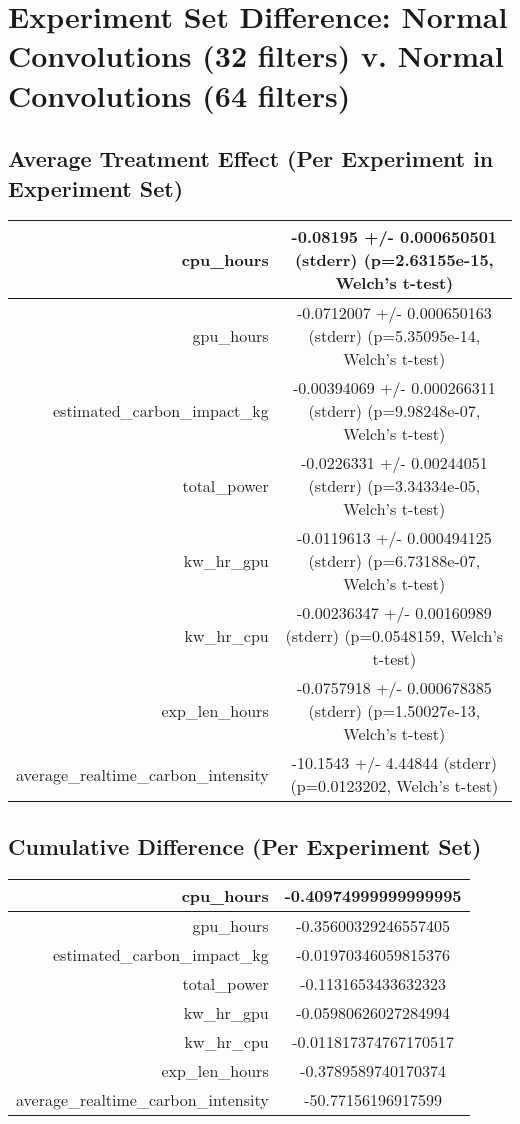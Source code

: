 \documentclass{article}%
\begin{document}
%
\normalsize%
\section{Experiment Set Difference: Normal Convolutions (32 filters) v. Normal Convolutions (64 filters)}%
\label{sec:Experiment Set Difference Normal Convolutions (32 filters) v. Normal Convolutions (64 filters)}%
\subsection{Average Treatment Effect (Per Experiment in Experiment Set)}%
\label{subsec:Average Treatment Effect (Per Experiment in Experiment Set)}%
\begin{tabular}{|r|c|}%
\hline%
cpu\_hours&{-}0.08195 +/{-} 0.000650501 (stderr) (p=2.63155e{-}15, Welch's t{-}test)\\%
\hline%
gpu\_hours&{-}0.0712007 +/{-} 0.000650163 (stderr) (p=5.35095e{-}14, Welch's t{-}test)\\%
\hline%
estimated\_carbon\_impact\_kg&{-}0.00394069 +/{-} 0.000266311 (stderr) (p=9.98248e{-}07, Welch's t{-}test)\\%
\hline%
total\_power&{-}0.0226331 +/{-} 0.00244051 (stderr) (p=3.34334e{-}05, Welch's t{-}test)\\%
\hline%
kw\_hr\_gpu&{-}0.0119613 +/{-} 0.000494125 (stderr) (p=6.73188e{-}07, Welch's t{-}test)\\%
\hline%
kw\_hr\_cpu&{-}0.00236347 +/{-} 0.00160989 (stderr) (p=0.0548159, Welch's t{-}test)\\%
\hline%
exp\_len\_hours&{-}0.0757918 +/{-} 0.000678385 (stderr) (p=1.50027e{-}13, Welch's t{-}test)\\%
\hline%
average\_realtime\_carbon\_intensity&{-}10.1543 +/{-} 4.44844 (stderr) (p=0.0123202, Welch's t{-}test)\\%
\hline%
\end{tabular}

%
\subsection{Cumulative Difference (Per Experiment Set)}%
\label{subsec:Cumulative Difference (Per Experiment Set)}%
\begin{tabular}{|r|c|}%
\hline%
cpu\_hours&{-}0.40974999999999995\\%
\hline%
gpu\_hours&{-}0.35600329246557405\\%
\hline%
estimated\_carbon\_impact\_kg&{-}0.01970346059815376\\%
\hline%
total\_power&{-}0.1131653433632323\\%
\hline%
kw\_hr\_gpu&{-}0.05980626027284994\\%
\hline%
kw\_hr\_cpu&{-}0.011817374767170517\\%
\hline%
exp\_len\_hours&{-}0.3789589740170374\\%
\hline%
average\_realtime\_carbon\_intensity&{-}50.77156196917599\\%
\hline%
\end{tabular}

%
\end{document}
